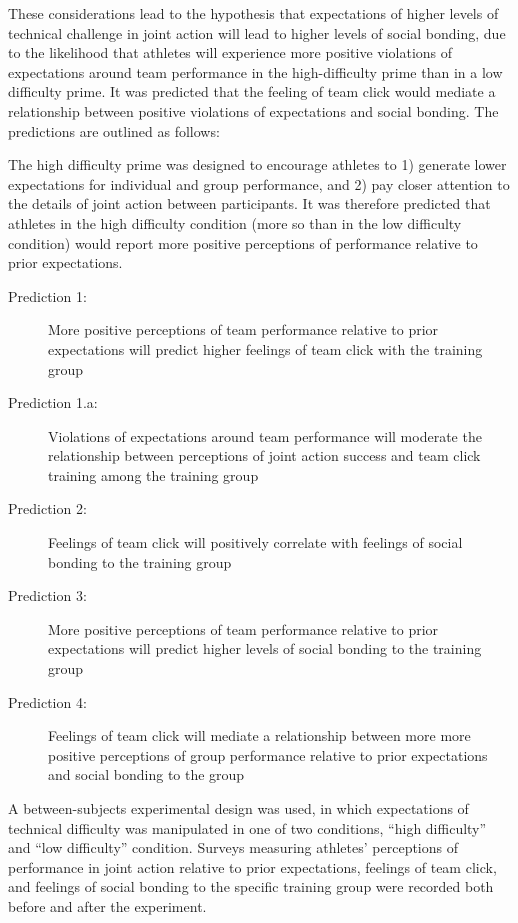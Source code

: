 These considerations lead to the hypothesis that expectations of higher levels of technical challenge in joint action will lead to higher levels of social bonding, due to the likelihood that athletes will experience more positive violations of expectations around team performance in the high-difficulty prime than in a low difficulty prime. It was predicted that the feeling of team click would mediate a relationship between positive violations of expectations and social bonding.  The predictions are outlined as follows:

The high difficulty prime was designed to encourage athletes to 1) generate lower expectations for individual and group performance, and 2) pay closer attention to the details of joint action between participants. It was therefore predicted that athletes in the high difficulty condition (more so than in the low difficulty condition) would report more positive perceptions of performance relative to prior expectations.

\begin{description}
\item[Prediction 1:] More positive perceptions of team performance relative to prior expectations will predict higher feelings of team click with the training group
\item[Prediction 1.a:] Violations of expectations around team performance will moderate the relationship between perceptions of joint action success and team click training among the training group
\item[Prediction 2:] Feelings of team click will positively correlate with feelings of social bonding to the training group
\item[Prediction 3:] More positive perceptions of team performance relative to prior expectations will predict higher levels of social bonding to the training group
\item[Prediction 4:] Feelings of team click will mediate a relationship between more more positive perceptions of group performance relative to prior expectations and social bonding to the group
\end{description}

A between-subjects experimental design was used, in which expectations of technical difficulty was manipulated in one of two conditions, ``high difficulty'' and ``low difficulty'' condition.  Surveys measuring athletes' perceptions of performance in joint action relative to prior expectations, feelings of team click, and feelings of social bonding to the specific training group were recorded both before and after the experiment.

